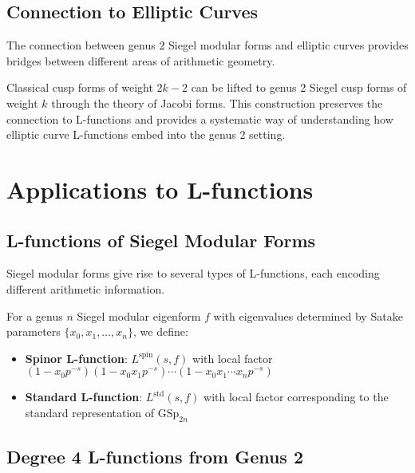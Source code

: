 \subsection{Connection to Elliptic Curves}

The connection between genus 2 Siegel modular forms and elliptic curves provides bridges between different areas of arithmetic geometry.

\begin{example}
Classical cusp forms of weight $2k-2$ can be lifted to genus 2 Siegel cusp forms of weight $k$ through the theory of Jacobi forms. This construction preserves the connection to L-functions and provides a systematic way of understanding how elliptic curve L-functions embed into the genus 2 setting.
\end{example}

\section{Applications to L-functions}
\label{sec:l_functions}

\subsection{L-functions of Siegel Modular Forms}

Siegel modular forms give rise to several types of L-functions, each encoding different arithmetic information.

\begin{definition}
\label{def:spinor_standard}
For a genus $n$ Siegel modular eigenform $f$ with eigenvalues determined by Satake parameters $\{x_0, x_1, \ldots, x_n\}$, we define:

\begin{itemize}
\item \textbf{Spinor L-function}: $L^{\text{spin}}(s,f)$ with local factor $(1-x_0 p^{-s})(1-x_0 x_1 p^{-s}) \cdots (1-x_0 x_1 \cdots x_n p^{-s})$
\item \textbf{Standard L-function}: $L^{\text{std}}(s,f)$ with local factor corresponding to the standard representation of $\mathrm{GSp}_{2n}$
\end{itemize}
\end{definition}

\subsection{Degree 4 L-functions from Genus 2}

